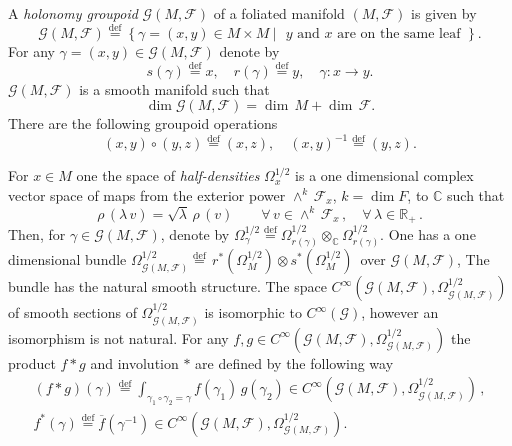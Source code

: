 \documentclass{beamer}
\theoremstyle{plain}
\newcommand{\be}{\begin{equation}}
\newcommand{\ee}{\end{equation}}
\newcommand{\C}{\mathbb{C}}
\newcommand{\G}{\mathcal{G}}
\newcommand{\sF}{\mathcal{F}}       %
\newcommand{\la}{\lambda}
\newcommand{\bydef}{\stackrel{\mathrm{def}}{=}}
\begin{document}
\begin{frame}
A \textit{holonomy groupoid} $\G\left(M, \sF\right)$ of a foliated manifold $\left(M, \sF\right)$ is given by
$$
\mathcal G\left(M, \sF\right)\bydef \left\{\left.\gamma = (x, y)\in M\times M~ \right|\text{ $y$ and $x$ are on the same leaf } \right\}.
$$
For any  $\gamma = (x, y)\in \mathcal G\left(M, \sF\right)$ denote by
$$
s\left(\gamma\right)\bydef x, \quad  r\left(\gamma\right)\bydef y, \quad \gamma: x \to y.
$$
$\mathcal G\left(M, \sF\right)$ is a smooth manifold such that
$$
\dim \mathcal G\left(M, \sF\right) = \dim \,M + \dim \,\mathcal F.
$$
There are the following groupoid operations
$$
\left(x, y \right) \circ \left(y, z \right) \bydef \left(x, z \right), \quad \left(x, y \right)^{-1} \bydef \left(y, z\right). 
$$

\end{frame}
\begin{frame}
For
$x\in M$ one the space of \textit{half-densities} $\Omega_x^{1/2}$ is a one dimensional complex
vector space of maps from the exterior power $\wedge^k \,  \mathcal{F}_x$, $k =
\dim F$, to ${\mathbb C}$ such that
$$
\rho \, (\lambda \, v) =\sqrt{\la}\, \rho \, (v)
\qquad \forall \, v \in \wedge^k \,  \mathcal{F}_x \, , \quad \forall \,
\lambda \in {\mathbb R}_+ \, .
$$
Then, for $\gamma \in\mathcal G\left(M, \sF\right)$, denote by $\Omega_{\gamma}^{1/2}\bydef\Omega_{r\left(\gamma\right)}^{1/2} \otimes_\C
\Omega_{r\left(\gamma\right)}^{1/2}$. One has a one dimensional bundle $
\Omega_{\mathcal G\left(M, \sF\right)}^{1/2}\bydef\, r^*(\Omega_M^{1/2})\otimes s^*(\Omega_M^{1/2})\,
$ over $\mathcal G\left(M, \sF\right)$, The bundle has the natural smooth structure. The  space  $C^{\infty}\left(\mathcal G\left(M, \sF\right) , \Omega^{1/2}_{\mathcal G\left(M, \sF\right)}\right)$ of smooth sections of $
\Omega_{\mathcal G\left(M, \sF\right)}^{1/2}$ is isomorphic to  $C^\infty(\mathcal G)$, however an isomorphism is not natural.
For any $f, g \in C^{\infty}\left(\mathcal G\left(M, \sF\right) , \Omega^{1/2}_{\mathcal G\left(M, \sF\right)}\right)$  the
product $f* g$ and involution $*$ are defined by the following way
\be\nonumber
\begin{split}
	(f * g) (\gamma) \bydef \int_{\gamma_1 \circ \gamma_2 = \gamma}
	f(\gamma_1) \, g(\gamma_2)\in C^{\infty}\left(\mathcal G\left(M, \sF\right) , \Omega^{1/2}_{\mathcal G\left(M, \sF\right)}\right)  \,,\\
	f^*\left(\gamma \right) \bydef \overline f \left( \gamma^{-1}\right) \in C^{\infty}\left(\mathcal G\left(M, \sF\right) , \Omega^{1/2}_{\mathcal G\left(M, \sF\right)}\right).
\end{split}
\ee
\end{frame}
\end{document}
